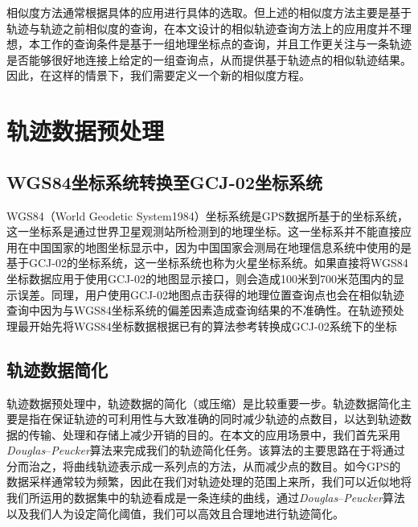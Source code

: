 相似度方法通常根据具体的应用进行具体的选取。但上述的相似度方法主要是基于轨迹与轨迹之前相似度的查询，在本文设计的相似轨迹查询方法上的应用度并不理想，本工作的查询条件是基于一组地理坐标点的查询，并且工作更关注与一条轨迹是否能够很好地连接上给定的一组查询点，从而提供基于轨迹点的相似轨迹结果。因此，在这样的情景下，我们需要定义一个新的相似度方程。
\\

\section{轨迹数据预处理}
\label{sec:preprocess}

\subsection{WGS84坐标系统转换至GCJ-02坐标系统}
\label{subsec:coord-transform}
WGS84（World Geodetic System1984）坐标系统是GPS数据所基于的坐标系统，这一坐标系是通过世界卫星观测站所检测到的地理坐标。这一坐标系并不能直接应用在中国国家的地图坐标显示中，因为中国国家会测局在地理信息系统中使用的是基于GCJ-02的坐标系统，这一坐标系统也称为火星坐标系统。如果直接将WGS84坐标数据应用于使用GCJ-02的地图显示接口，则会造成100米到700米范围内的显示误差。同理，用户使用GCJ-02地图点击获得的地理位置查询点也会在相似轨迹查询中因为与WGS84坐标系统的偏差因素造成查询结果的不准确性。在轨迹预处理最开始先将WGS84坐标数据根据已有的算法\footnotemark[1]参考转换成GCJ-02系统下的坐标
\\


\subsection{轨迹数据简化}
\label{subsec:trajectory simplification}
轨迹数据预处理中，轨迹数据的简化（或压缩）是比较重要一步。轨迹数据简化主要是指在保证轨迹的可利用性与大致准确的同时减少轨迹的点数目，以达到轨迹数据的传输、处理和存储上减少开销的目的。在本文的应用场景中，我们首先采用\emph{Douglas}–\emph{Peucker}算法来完成我们的轨迹简化任务。该算法的主要思路在于将通过分而治之，将曲线轨迹表示成一系列点的方法，从而减少点的数目。如今GPS的数据采样通常较为频繁，因此在我们对轨迹处理的范围上来所，我们可以近似地将我们所运用的数据集中的轨迹看成是一条连续的曲线，通过\emph{Douglas}–\emph{Peucker}算法以及我们人为设定简化阈值，我们可以高效且合理地进行轨迹简化。

